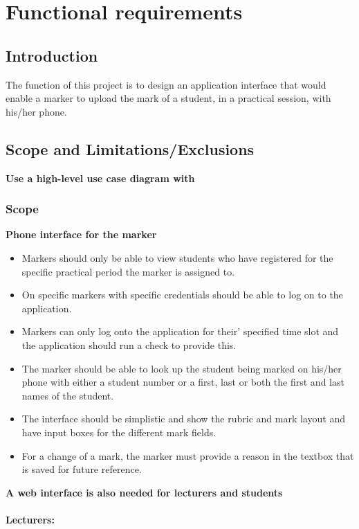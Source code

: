 \documentclass[11pt,a4paper]{article}
\begin{document}
\section{Functional requirements}
\subsection{Introduction}
The function of this project is to design an application interface that would enable a marker to upload the mark of a student, in a practical session, with his/her phone.
\subsection{Scope and Limitations/Exclusions}
\textbf {Use a high-level use case diagram with}\\
\subsubsection{Scope}
\textbf {Phone interface for the marker}

\begin{itemize}
\item Markers should only be able to view students who have registered for the specific practical period the marker is assigned to.
\item On specific markers with specific credentials should be able to log on to the application.
\item Markers can only log onto the application for their’ specified time slot and the application should run a check to provide this.
\item The marker should be able to look up the student being marked on his/her phone with either a student number or a first, last or both the first and last names of the student.
\item The interface should be simplistic and show the rubric and mark layout and have input boxes for the different mark fields.
\item For a change of a mark, the marker must provide a reason in the textbox that is saved for future reference.
\end{itemize}
\textbf{A web interface is also needed for lecturers and students}\\\\
\textbf{Lecturers:}
\end{document}
